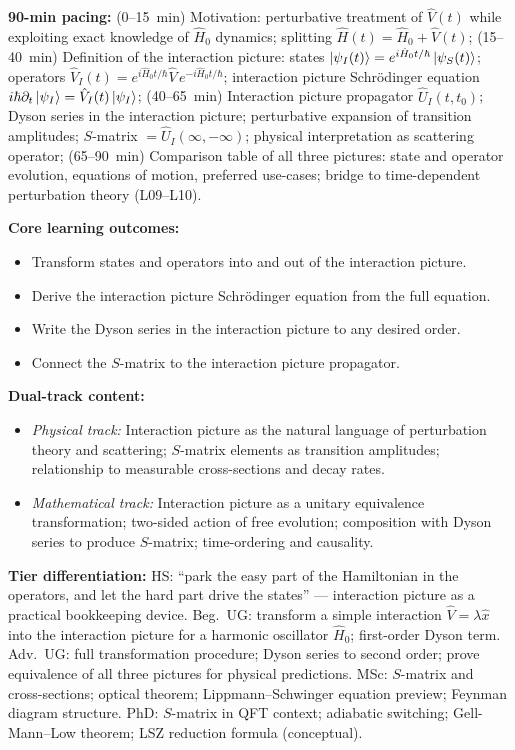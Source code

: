 \documentclass[11pt,a4paper]{article}
\begin{document}
\medskip
\begin{tcolorbox}[modulebox, title={Module~I.3 --- Lecture L08: The Dirac (Interaction) Picture}]
\textbf{90-min pacing:} (0--15~min) Motivation: perturbative treatment of $\hat{V}(t)$
while exploiting exact knowledge of $\hat{H}_0$ dynamics;
splitting $\hat{H}(t)=\hat{H}_0+\hat{V}(t)$;
(15--40~min) Definition of the interaction picture:
states $\ket{\psi_I(t)}=e^{i\hat{H}_0 t/\hbar}\ket{\psi_S(t)}$;
operators $\hat{V}_I(t)=e^{i\hat{H}_0 t/\hbar}\hat{V}\,e^{-i\hat{H}_0 t/\hbar}$;
interaction picture Schr\"odinger equation $i\hbar\partial_t\ket{\psi_I}=\hat{V}_I(t)\ket{\psi_I}$;
(40--65~min) Interaction picture propagator $\hat{U}_I(t,t_0)$;
Dyson series in the interaction picture; perturbative expansion of transition amplitudes;
$S$-matrix $=\hat{U}_I(\infty,-\infty)$; physical interpretation as scattering operator;
(65--90~min) Comparison table of all three pictures: state and operator evolution,
equations of motion, preferred use-cases; bridge to time-dependent perturbation theory (L09--L10).

\medskip\textbf{Core learning outcomes:}
\begin{itemize}[leftmargin=1.4em,topsep=2pt,itemsep=1pt]
  \item Transform states and operators into and out of the interaction picture.
  \item Derive the interaction picture Schr\"odinger equation from the full equation.
  \item Write the Dyson series in the interaction picture to any desired order.
  \item Connect the $S$-matrix to the interaction picture propagator.
\end{itemize}

\medskip\textbf{Dual-track content:}
\begin{itemize}[leftmargin=1.4em,topsep=2pt,itemsep=1pt]
  \item \textit{Physical track:} Interaction picture as the natural language of
    perturbation theory and scattering; $S$-matrix elements as transition amplitudes;
    relationship to measurable cross-sections and decay rates.
  \item \textit{Mathematical track:} Interaction picture as a unitary equivalence
    transformation; two-sided action of free evolution; composition with Dyson series
    to produce $S$-matrix; time-ordering and causality.
\end{itemize}

\medskip\textbf{Tier differentiation:}
HS: ``park the easy part of the Hamiltonian in the operators, and let the hard part
drive the states'' --- interaction picture as a practical bookkeeping device.
Beg.\ UG: transform a simple interaction $\hat{V}=\lambda\hat{x}$ into the
interaction picture for a harmonic oscillator $\hat{H}_0$; first-order Dyson term.
Adv.\ UG: full transformation procedure; Dyson series to second order;
prove equivalence of all three pictures for physical predictions.
MSc: $S$-matrix and cross-sections; optical theorem;
Lippmann--Schwinger equation preview; Feynman diagram structure.
PhD: $S$-matrix in QFT context; adiabatic switching; Gell-Mann--Low theorem;
LSZ reduction formula (conceptual).


\end{tcolorbox}
\end{document}

